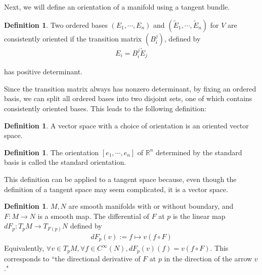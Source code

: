 \documentclass[11pt, psamsfonts]{amsart}
\theoremstyle{definition}
\newtheorem{defn}[thm]{Definition}
\theoremstyle{remark}
\numberwithin{equation}{section}
\begin{document}
Next, we will define an orientation of a manifold using a tangent bundle.

\begin{defn}
  Two ordered bases $(E_1, \cdots, E_n)$ and $(\tilde{E}_1, \cdots, \tilde{E}_n)$ for $V$ are consistently oriented if the transition matrix $(B^j_i)$, defined by
  \begin{align*}
    E_i = B^j_i \tilde{E}_j
  \end{align*}

  has positive determinant.
\end{defn}

Since the transition matrix always has nonzero determinant, by fixing an ordered basis, we can split all ordered bases into two disjoint sets, one of which contains consistently oriented bases.
This leads to the following definition:

\begin{defn}
  A vector space with a choice of orientation is an oriented vector space.
\end{defn}

\begin{defn}
  The orientation $[e_1, \cdots, e_n]$ of $\mathbb{R}^n$ determined by the standard basis is called the standard orientation.
\end{defn}

This definition can be applied to a tangent space because, even though the definition of a tangent space may seem complicated, it is a vector space.

% 

% 

\begin{defn}
  $M, N$ are smooth manifolds with or without boundary, and $F: M \rightarrow N$ is a smooth map.
  The differential of $F$ at $p$ is the linear map $dF_p: T_pM \rightarrow T_{F(p)}N$ defined by
  \begin{align*}
    dF_p(v) := f \mapsto v(f \circ F)
  \end{align*}
  Equivalently, $\forall v \in T_pM, \forall f \in C^{\infty}(N), dF_p(v)(f) = v(f \circ F)$.
  This corresponds to ``the directional derivative of $F$ at $p$ in the direction of the arrow $v$."
\end{defn}
\end{document}
